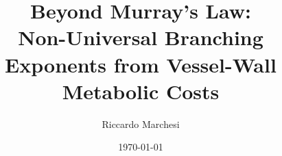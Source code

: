 \documentclass[11pt,a4paper]{article}
\theoremstyle{remark}
\begin{document}
\newcommand{\ClassImpedance}{2.000}                %
\newcommand{\ClassDaVinci}{2.500}                  %
\newcommand{\ClassWall}{2.885}                     %
\newcommand{\ClassMurray}{3.000}                   %

\newcommand{\AngleMurrayFull}{74.9}                %
\newcommand{\AngleWallFull}{80.2}                  %

\newcommand{\DeltaAlphaMurray}{0.30}               %
\newcommand{\DeltaAlphaOurs}{0.20}                 %
\newcommand{\AlphaScaleRange}{0.012}               %
\newcommand{\AlphaPulmonaryLimit}{2.800}           %


\title{\LARGE\bfseries Beyond Murray's Law: \\[4pt] 
Non-Universal Branching Exponents from Vessel-Wall Metabolic Costs}

\author{Riccardo Marchesi}
\date{\today}

\maketitle
\end{document}
